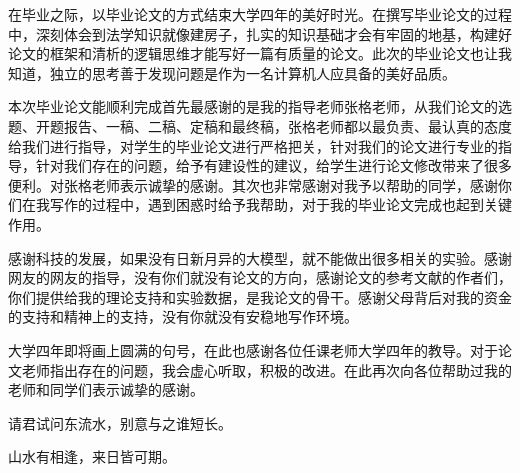 \begin{ack}
在毕业之际，以毕业论文的方式结束大学四年的美好时光。在撰写毕业论文的过程中，深刻体会到法学知识就像建房子，扎实的知识基础才会有牢固的地基，构建好论文的框架和清析的逻辑思维才能写好一篇有质量的论文。此次的毕业论文也让我知道，独立的思考善于发现问题是作为一名计算机人应具备的美好品质。

本次毕业论文能顺利完成首先最感谢的是我的指导老师张格老师，从我们论文的选题、开题报告、一稿、二稿、定稿和最终稿，张格老师都以最负责、最认真的态度给我们进行指导，对学生的毕业论文进行严格把关，针对我们的论文进行专业的指导，针对我们存在的问题，给予有建设性的建议，给学生进行论文修改带来了很多便利。对张格老师表示诚挚的感谢。其次也非常感谢对我予以帮助的同学，感谢你们在我写作的过程中，遇到困惑时给予我帮助，对于我的毕业论文完成也起到关键作用。

感谢科技的发展，如果没有日新月异的大模型，就不能做出很多相关的实验。感谢网友的网友的指导，没有你们就没有论文的方向，感谢论文的参考文献的作者们，你们提供给我的理论支持和实验数据，是我论文的骨干。感谢父母背后对我的资金的支持和精神上的支持，没有你就没有安稳地写作环境。

大学四年即将画上圆满的句号，在此也感谢各位任课老师大学四年的教导。对于论文老师指出存在的问题，我会虚心听取，积极的改进。在此再次向各位帮助过我的老师和同学们表示诚挚的感谢。

\begin{center}
    请君试问东流水，别意与之谁短长。

    山水有相逢，来日皆可期。
\end{center}

\end{ack}
